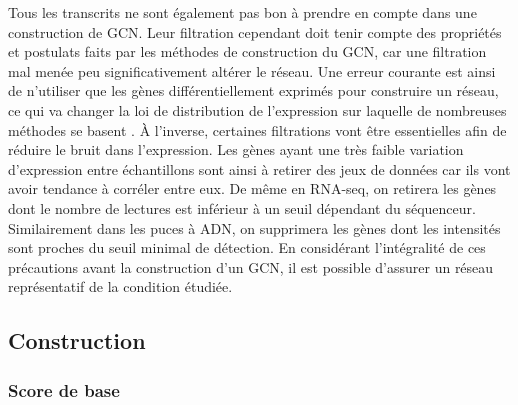 Tous les transcrits ne sont également pas bon à prendre en compte dans une construction de \acrshort{GCN}. Leur filtration cependant doit tenir compte des propriétés et postulats faits par les méthodes de construction du \acrshort{GCN}, car une filtration mal menée peu significativement altérer le réseau. Une erreur courante est ainsi de n'utiliser que les gènes différentiellement exprimés pour construire un réseau, ce qui va changer la loi de distribution de l'expression sur laquelle de nombreuses méthodes se basent \cite{Zhang2005a}. À l'inverse, certaines filtrations vont être essentielles afin de réduire le bruit dans l'expression. Les gènes ayant une très faible variation d'expression entre échantillons sont ainsi à retirer des jeux de données car ils vont avoir tendance à corréler entre eux. De même en RNA-seq, on retirera les gènes dont le nombre de lectures est inférieur à un seuil dépendant du séquenceur. Similairement dans les puces à ADN, on supprimera les gènes dont les intensités sont proches du seuil minimal de détection. En considérant l'intégralité de ces précautions avant la construction d'un \acrshort{GCN}, il est possible d'assurer un réseau représentatif de la condition étudiée.



\subsection{Construction}

\subsubsection{Score de base}

